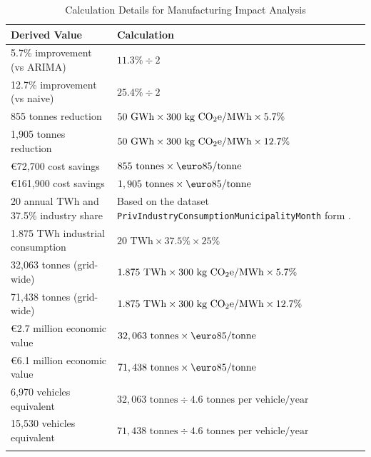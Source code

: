 \begin{xltabular}{\textwidth}{lX}
    \hline
    \textbf{Derived Value}              & \textbf{Calculation} \\ \hline
    \endfirsthead

    5.7\% improvement (vs ARIMA)            & \(11.3\% \div 2\)                                                                                    \\
    12.7\% improvement (vs naive)           & \(25.4\% \div 2\)                                                                                    \\
    855 tonnes \cotwoe{} reduction          & \(50 \text{ GWh} \times 300 \text{ kg CO$_{2}$e{}/MWh} \times 5.7\%\)                                  \\
    1,905 tonnes \cotwoe{} reduction        & \(50 \text{ GWh} \times 300 \text{ kg CO$_{2}$e{}/MWh} \times 12.7\%\)                                 \\
    \euro72,700 cost savings                    & \(855 \text{ tonnes} \times \text{\euro}85/\text{tonne}\)                                                \\
    \euro161,900 cost savings                   & \(1,905 \text{ tonnes} \times \text{\euro}85/\text{tonne}\)                                              \\
    20 annual TWh and 37.5\% industry share & Based on the dataset \texttt{PrivIndustryConsumptionMunicipalityMonth} form \textcite{energidataservice2025}. \\
    1.875 TWh industrial consumption        & \(20 \text{ TWh} \times 37.5\% \times 25\%\)                                                         \\
    32,063 tonnes \cotwoe{} (grid-wide)     & \(1.875 \text{ TWh} \times 300 \text{ kg CO$_{2}$e{}/MWh} \times 5.7\%\)                               \\
    71,438 tonnes \cotwoe{} (grid-wide)     & \(1.875 \text{ TWh} \times 300 \text{ kg CO$_{2}$e{}/MWh} \times 12.7\%\)                              \\
    \euro2.7 million economic value             & \(32,063 \text{ tonnes} \times \text{\euro}85/\text{tonne}\)                                             \\
    \euro6.1 million economic value             & \(71,438 \text{ tonnes} \times \text{\euro}85/\text{tonne}\)                                             \\
    6,970 vehicles equivalent               & \(32,063 \text{ tonnes} \div 4.6 \text{ tonnes per vehicle/year}\)                                   \\
    15,530 vehicles equivalent              & \(71,438 \text{ tonnes} \div 4.6 \text{ tonnes per vehicle/year}\)                                   \\

    \hline
    \caption{Calculation Details for Manufacturing Impact Analysis}
    \label{tab:manufacturing-impact-calculations}
\end{xltabular}

